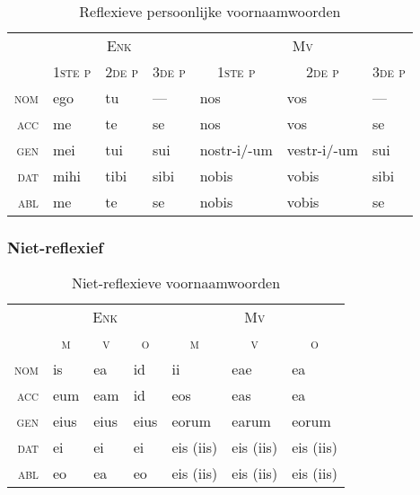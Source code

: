 \documentclass[12pt,a4paper]{article}
\begin{document}
\begin{table}[H]
\centering
\begin{tabular}{ r | l l l | l l l }
\toprule
 & \multicolumn{3}{c|}{\textsc{Enk}} & \multicolumn{3}{c}{\textsc{Mv}} \\
 & \multicolumn{1}{c}{\textsc{1ste p}} & \multicolumn{1}{c}{\textsc{2de p}} & \multicolumn{1}{c|}{\textsc{3de p}} & \multicolumn{1}{c}{\textsc{1ste p}} & \multicolumn{1}{c}{\textsc{2de p}} & \multicolumn{1}{c}{\textsc{3de p}} \\ 
\midrule
\textsc{nom} & ego  & tu   & ---    & nos         & vos          & ---  \\
\textsc{acc} & me   & te   & se     & nos         & vos          & se   \\
\textsc{gen} & mei  & tui  & sui    & nostr-i/-um & vestr-i/-um  & sui  \\
\textsc{dat} & mihi & tibi & sibi   & nobis       & vobis        & sibi \\
\textsc{abl} & me   & te   & se     & nobis       & vobis        & se   \\
\bottomrule
\end{tabular}
\caption{Reflexieve persoonlijke voornaamwoorden}
\label{tab:reflvnw}
\end{table}

\subsubsection{Niet-reflexief}

\begin{table}[H]
\centering
\begin{tabular}{ r | l l l | l l l }
\toprule
 & \multicolumn{3}{c|}{\textsc{Enk}} & \multicolumn{3}{c}{\textsc{Mv}} \\
 & \multicolumn{1}{c}{\textsc{m}} & \multicolumn{1}{c}{\textsc{v}} & \multicolumn{1}{c|}{\textsc{o}} & \multicolumn{1}{c}{\textsc{m}} & \multicolumn{1}{c}{\textsc{v}} & \multicolumn{1}{c}{\textsc{o}} \\ 
\midrule
\textsc{nom} & is   & ea   & id   & ii        & eae       & ea        \\
\textsc{acc} & eum  & eam  & id   & eos       & eas       & ea        \\
\textsc{gen} & eius & eius & eius & eorum     & earum     & eorum     \\
\textsc{dat} & ei   & ei   & ei   & eis (iis) & eis (iis) & eis (iis) \\
\textsc{abl} & eo   & ea   & eo   & eis (iis) & eis (iis) & eis (iis) \\
\bottomrule
\end{tabular}
\caption{Niet-reflexieve voornaamwoorden}
\label{tab:ntreflvnw}
\end{table}
\end{document}
